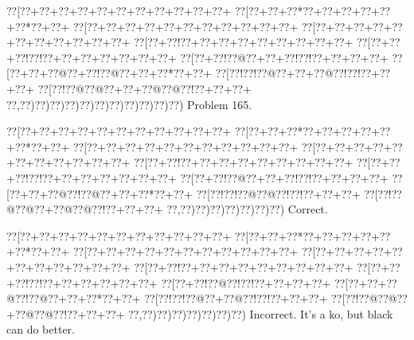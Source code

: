 \documentclass[a5paper]{article}
\begin{document}
\newpage
\begin{center}
{\goo
\0??[\0??+\0??+\0??+\0??+\0??+\0??+\0??+\0??+\0??+\0??+\0??+
\0??[\0??+\0??+\0??*\0??+\0??+\0??+\0??+\0??+\0??*\0??+\0??+
\0??[\0??+\0??+\0??+\0??+\0??+\0??+\0??+\0??+\0??+\0??+\0??+
\0??[\0??+\0??+\0??+\0??+\0??+\0??+\0??+\0??+\0??+\0??+\0??+
\0??[\0??+\0??!\0??+\0??+\0??+\0??+\0??+\0??+\0??+\0??+\0??+
\0??[\0??+\0??+\0??!\0??!\0??+\0??+\0??+\0??+\0??+\0??+\0??+
\0??[\0??+\0??!\0??@\0??+\0??+\0??!\0??!\0??+\0??+\0??+\0??+
\0??[\0??+\0??+\0??@\0??+\0??!\0??@\0??+\0??+\0??*\0??+\0??+
\0??[\0??!\0??!\0??@\0??+\0??+\0??@\0??!\0??!\0??+\0??+\0??+
\0??[\0??!\0??@\0??@\0??+\0??+\0??@\0??@\0??!\0??+\0??+\0??+
\0??,\0??)\0??)\0??)\0??)\0??)\0??)\0??)\0??)\0??)\0??)\0??)
}
Problem 165.

\end{center}
\begin{center}
{\goo
\0??[\0??+\0??+\0??+\0??+\0??+\0??+\0??+\0??+\0??+\0??+\0??+
\0??[\0??+\0??+\0??*\0??+\0??+\0??+\0??+\0??+\0??*\0??+\0??+
\0??[\0??+\0??+\0??+\0??+\0??+\0??+\0??+\0??+\0??+\0??+\0??+
\0??[\0??+\0??+\0??+\0??+\0??+\0??+\0??+\0??+\0??+\0??+\0??+
\0??[\0??+\0??!\0??+\0??+\0??+\0??+\0??+\0??+\0??+\0??+\0??+
\0??[\0??+\0??+\0??!\0??!\0??+\0??+\0??+\0??+\0??+\0??+\0??+
\0??[\0??+\0??!\0??@\0??+\0??+\0??!\0??!\0??+\0??+\0??+\0??+
\0??[\0??+\0??+\0??@\0??!\0??@\0??+\0??+\0??*\0??+\0??+
\0??[\0??!\0??!\0??@\0??@\0??!\0??!\0??+\0??+\0??+
\0??[\0??!\0??@\0??@\0??+\0??@\0??@\0??!\0??+\0??+\0??+
\0??,\0??)\0??)\0??)\0??)\0??)\0??)\0??)
}
Correct. 

\end{center}
\begin{center}
{\goo
\0??[\0??+\0??+\0??+\0??+\0??+\0??+\0??+\0??+\0??+\0??+\0??+
\0??[\0??+\0??+\0??*\0??+\0??+\0??+\0??+\0??+\0??*\0??+\0??+
\0??[\0??+\0??+\0??+\0??+\0??+\0??+\0??+\0??+\0??+\0??+\0??+
\0??[\0??+\0??+\0??+\0??+\0??+\0??+\0??+\0??+\0??+\0??+\0??+
\0??[\0??+\0??!\0??+\0??+\0??+\0??+\0??+\0??+\0??+\0??+\0??+
\0??[\0??+\0??+\0??!\0??!\0??+\0??+\0??+\0??+\0??+\0??+
\0??[\0??+\0??!\0??@\0??!\0??!\0??+\0??+\0??+\0??+
\0??[\0??+\0??+\0??@\0??!\0??@\0??+\0??+\0??*\0??+\0??+
\0??[\0??!\0??!\0??@\0??+\0??@\0??!\0??!\0??+\0??+\0??+
\0??[\0??!\0??@\0??@\0??+\0??@\0??@\0??!\0??+\0??+\0??+
\0??,\0??)\0??)\0??)\0??)\0??)\0??)\0??)
}
Incorrect. It's a ko, but black can do better.

\end{center}
\end{document}
